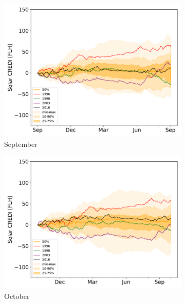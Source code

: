 \documentclass[12pt]{iopart}
\begin{document}
\begin{figure}[t]
\begin{subfigure}[t]{0.32\linewidth}
    \includegraphics[width=\linewidth]{Figures_SI/Fig_CUMSUM_YearStart_SPV_September}
    \caption{September }
\end{subfigure}
\begin{subfigure}[t]{0.32\linewidth}
    \includegraphics[width=\linewidth]{Figures_SI/Fig_CUMSUM_YearStart_SPV_October}
    \caption{October }
\end{subfigure}
\begin{subfigure}[t]{0.32\linewidth}

\end{subfigure}
\end{figure}
\end{document}
